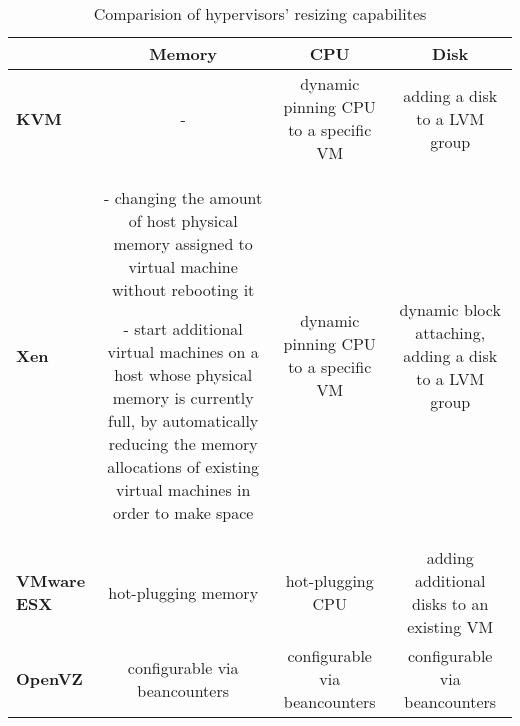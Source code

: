 \documentclass[twocolumn]{svjour3}          %
\begin{document}
\begin{table*}[ht]
  \renewcommand{\arraystretch}{2}
  \begin{tabular}{p{2.5cm} | *{3}{C}}
     & \textbf{Memory} & \textbf{CPU} & \textbf{Disk} \\ \hline

   \textbf{KVM} & 
   - &
   dynamic pinning CPU to a specific VM \footnotemark[1] &
   adding a disk to a LVM group 
   \\ \hline

   \textbf{Xen} &
  - changing the amount of host physical memory assigned to virtual machine without rebooting it

  - start additional virtual machines on a host whose physical memory is currently full, by automatically reducing the memory allocations of existing virtual machines in order to make space &
  dynamic pinning CPU to a specific VM \footnotemark[1] &
  dynamic block attaching, adding a disk to a LVM group
  \\ \hline

  \textbf{VMware ESX} &
hot-plugging memory \footnotemark[2] & 
hot-plugging CPU \footnotemark[2]  &
adding additional disks to an existing VM
\\ \hline

\textbf{OpenVZ} & configurable via beancounters & configurable via beancounters & configurable via beancounters\\ \hline



\end{tabular}

\caption{Comparision of hypervisors' resizing capabilites}
\label{tab:hypervisors-resizing}

\end{table*}
\end{document}
